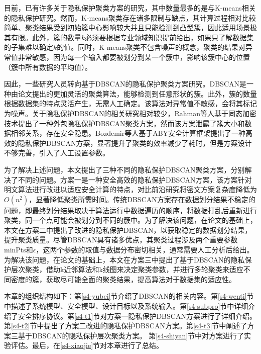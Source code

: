 目前，已有许多关于隐私保护聚类方案的研究，其中数量最多的是与K-means相关的隐私保护研究\cite{hegde2021sok}。然而，K-means聚类存在诸多限制与缺点，其计算过程相对比较简单、聚类结果受到初始簇中心影响较大并且只能检测到凸型簇，因此适用场景极其有限。此外，簇的数量$k$必须要根据专业领域知识提前给出，如果只了解数据集的子集难以确定$k$的值。同时，K-means聚类不包含噪声的概念，聚类的结果对异常值非常敏感，因为每一个输入都要被划分到某一个簇中，影响该簇中心的位置（簇中所有数据的平均值）。

因此，一些研究人员转向基于DBSCAN的隐私保护聚类方案研究。DBSCAN是一种由论文\cite{ester1996density}提出的更加灵活的聚类算法，能够检测到任意形状的簇。此外，簇的数量根据数据集的特点灵活产生，无需人工确定。该算法对异常值不敏感，会将其标记为噪声。关于隐私保护DBSCAN的相关研究相对较少，Rahman等人\cite{rahman2017towards}基于同态加密技术提出了一种外包隐私保护DBSCAN聚类方案，然而该方案泄露了簇大小和数据相邻关系，存在安全隐患。Bozdemir等人\cite{bozdemir2021privacy}基于ABY安全计算框架提出了一种高效的隐私保护DBSCAN方案，显著提升了聚类的效率减少了耗时，但是方案设计不够完善，引入了人工设置参数。

为了解决上述问题，本文提出了三种不同的隐私保护DBSCAN聚类方案，分别解决了不同的问题。方案一是一种安全高效的隐私保护DBSCAN方案，该方案针对明文算法进行改进以适应安全计算的特点，对比前沿研究将密文方案复杂度降低为$O(n^2)$，显著降低聚类所需时间。传统DBSCAN方案存在数据划分结果不稳定的问题，即最终划分结果取决于算法运行中数据遍历的顺序，将数据打乱后重新进行聚类，同一个点可能会被划分到不同的簇中。为了解决该问题，在论文\cite{tran2013revised}的基础上，本文在方案二中提出了改进的隐私保护DBSCAN，以获取稳定的数据划分结果，提升聚类质量。尽管DBSCAN具有诸多优点，其聚类过程涉及两个重要参数minPts和$\epsilon$，这两个参数的取值与数据分布密切相关，通常需要人工分析后给出。为解决该问题，在论文\cite{latifi2021dbhc}的基础上，本文在方案三中提出了基于DBSCAN的隐私保护层次聚类，借助k近邻算法和k线图来决定聚类参数，并进行多轮聚类来适应不同密度的簇，获取尽可能全面的聚类结果，提高算法对于数据集的适应性。

本章的组织结构如下：第\ref{s4-yubei}节介绍了DBSCAN的相关内容。第\ref{s4-wenti}节中描述了系统模型、安全模型、设计目标以及系统输入。第\ref{s4-subpro}节中详细介绍了安全排序协议。第\ref{s4-t1}节对方案一隐私保护DBSCAN方案进行了详细介绍。第\ref{s4-t2}节中提出了方案二改进的隐私保护DBSCAN方案。第\ref{s4-t3}节中阐述了方案三基于DBSCAN的隐私保护层次聚类方案。
第\ref{s4-shiyan}节中对方案进行了实验评估。最后，在\ref{s4-xiaojie}节对本章进行了总结。

